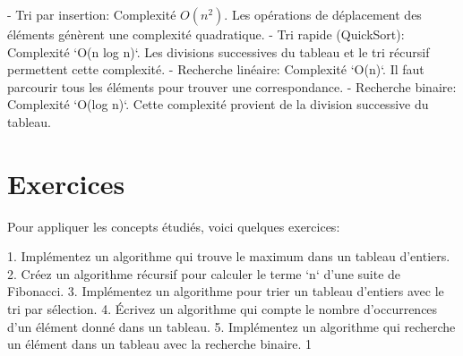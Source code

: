 - Tri par insertion: Complexité $O(n^2)$. Les opérations de déplacement des éléments génèrent une complexité quadratique.
- Tri rapide (QuickSort): Complexité `O(n log n)`. Les divisions successives du tableau et le tri récursif permettent cette complexité.
- Recherche linéaire: Complexité `O(n)`. Il faut parcourir tous les éléments pour trouver une correspondance.
- Recherche binaire: Complexité `O(log n)`. Cette complexité provient de la division successive du tableau.

\section{Exercices}
Pour appliquer les concepts étudiés, voici quelques exercices:

1. Implémentez un algorithme qui trouve le maximum dans un tableau d'entiers.
2. Créez un algorithme récursif pour calculer le terme `n` d'une suite de Fibonacci.
3. Implémentez un algorithme pour trier un tableau d'entiers avec le tri par sélection.
4. Écrivez un algorithme qui compte le nombre d'occurrences d'un élément donné dans un tableau.
5. Implémentez un algorithme qui recherche un élément dans un tableau avec la recherche binaire.
1


